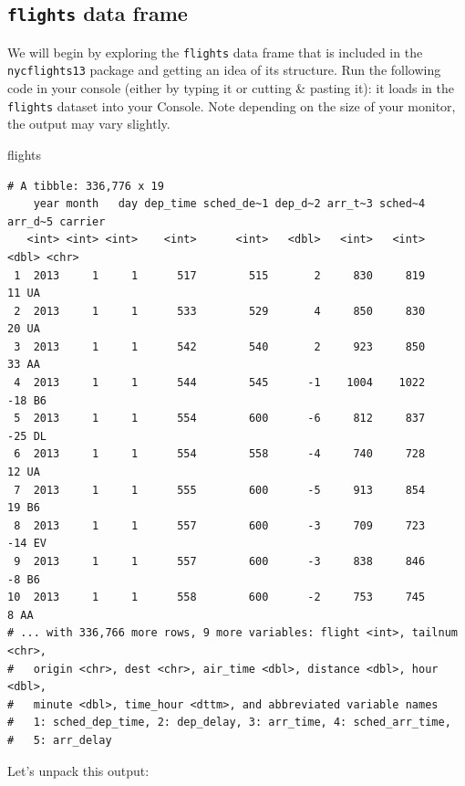 \documentclass[
  letterpaper,
  DIV=11,
  numbers=noendperiod]{scrreprt}
\newenvironment{Shaded}{\begin{snugshade}}{\end{snugshade}}
\newcommand{\NormalTok}[1]{\textcolor[rgb]{0.00,0.23,0.31}{#1}}
\theoremstyle{definition}
\theoremstyle{remark}
\begin{document}
\hypertarget{flights-data-frame}{%
\subsection{\texorpdfstring{\texttt{flights} data
frame}{flights data frame}}\label{flights-data-frame}}

We will begin by exploring the \texttt{flights} data frame that is
included in the \texttt{nycflights13} package and getting an idea of its
structure. Run the following code in your console (either by typing it
or cutting \& pasting it): it loads in the \texttt{flights} dataset into
your Console. Note depending on the size of your monitor, the output may
vary slightly.

\begin{Shaded}
\begin{Highlighting}[]
\NormalTok{flights}
\end{Highlighting}
\end{Shaded}

\begin{verbatim}
# A tibble: 336,776 x 19
    year month   day dep_time sched_de~1 dep_d~2 arr_t~3 sched~4 arr_d~5 carrier
   <int> <int> <int>    <int>      <int>   <dbl>   <int>   <int>   <dbl> <chr>  
 1  2013     1     1      517        515       2     830     819      11 UA     
 2  2013     1     1      533        529       4     850     830      20 UA     
 3  2013     1     1      542        540       2     923     850      33 AA     
 4  2013     1     1      544        545      -1    1004    1022     -18 B6     
 5  2013     1     1      554        600      -6     812     837     -25 DL     
 6  2013     1     1      554        558      -4     740     728      12 UA     
 7  2013     1     1      555        600      -5     913     854      19 B6     
 8  2013     1     1      557        600      -3     709     723     -14 EV     
 9  2013     1     1      557        600      -3     838     846      -8 B6     
10  2013     1     1      558        600      -2     753     745       8 AA     
# ... with 336,766 more rows, 9 more variables: flight <int>, tailnum <chr>,
#   origin <chr>, dest <chr>, air_time <dbl>, distance <dbl>, hour <dbl>,
#   minute <dbl>, time_hour <dttm>, and abbreviated variable names
#   1: sched_dep_time, 2: dep_delay, 3: arr_time, 4: sched_arr_time,
#   5: arr_delay
\end{verbatim}

Let's unpack this output:
\end{document}
